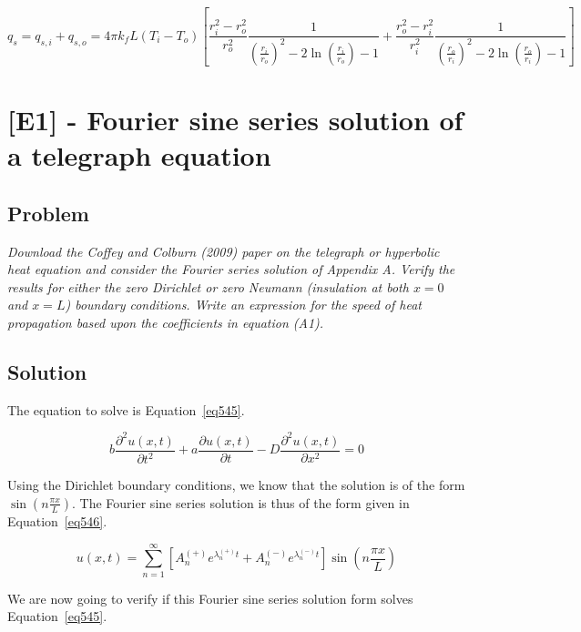 \begin{equation}\label{eq544}
q_s = q_{s,i} + q_{s,o} = 4\pi k_f L (T_i - T_o) \left[ \frac{r_i^2 - r_o^2}{r_o^2}\frac{1}{\left( \frac{r_i}{r_o} \right)^2 - 2\ln \left( \frac{r_i}{r_o} \right) - 1} + \frac{r_o^2 - r_i^2}{r_i^2}\frac{1}{\left( \frac{r_o}{r_i} \right)^2 - 2\ln \left( \frac{r_o}{r_i} \right) - 1} \right]
\end{equation}


\section{[E1] - Fourier sine series solution of a telegraph equation}
\label{prob53}

\subsection{Problem}
\textit{Download the Coffey and Colburn (2009) paper on the telegraph or hyperbolic heat equation and consider the Fourier series solution of Appendix A. Verify the results for either the zero Dirichlet or zero Neumann (insulation at both $x = 0$ and $x = L$) boundary conditions. Write an expression for the speed of heat propagation based upon the coefficients in equation (A1).}

\subsection{Solution}

The equation to solve is Equation~\ref{eq545}.

\begin{equation}\label{eq545}
b\frac{\partial^2 u(x,t)}{\partial t^2} + a\frac{\partial u(x,t)}{\partial t} - D\frac{\partial^2 u(x,t)}{\partial x^2} = 0
\end{equation}

Using the Dirichlet boundary conditions, we know that the solution is of the form $\sin \left( n\frac{\pi x}{L} \right)$. The Fourier sine series solution is thus of the form given in Equation~\ref{eq546}.

\begin{equation}\label{eq546}
u(x,t) = \sum_{n=1}^{\infty} \left[ A_n^{(+)}e^{\lambda_n^{(+)}t} + A_n^{(-)}e^{\lambda_n^{(-)}t} \right] \sin \left( n\frac{\pi x}{L} \right)
\end{equation}

We are now going to verify if this Fourier sine series solution form solves Equation~\ref{eq545}.

